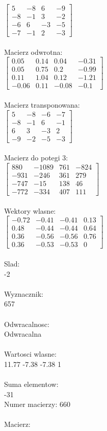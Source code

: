 \documentclass[a4paper,12pt]{article}
\begin{document}
$\begin{bmatrix} 5&-8&6&-9\\-8&-1&3&-2\\-6&6&-3&-5\\-7&-1&2&-3 \end{bmatrix}$
\\
\\
Macierz odwrotna:\\

$\begin{bmatrix} 0.05&0.14&0.04&-0.31\\0.05&0.75&0.2&-0.99\\0.11&1.04&0.12&-1.21\\-0.06&0.11&-0.08&-0.1 \end{bmatrix}$
\\
\\
Macierz transponowana:\\

$\begin{bmatrix} 5&-8&-6&-7\\-8&-1&6&-1\\6&3&-3&2\\-9&-2&-5&-3 \end{bmatrix}$
\\
\\
Macierz do potegi 3:\\

$\begin{bmatrix} 880&-1089&761&-824\\-931&-246&361&279\\-747&-15&138&46\\-772&-334&407&111 \end{bmatrix}$
\\
\\
Wektory wlasne:\\

$\begin{bmatrix} -0.72&-0.41&-0.41&0.13\\0.48&-0.44&-0.44&0.64\\0.36&-0.56&-0.56&0.76\\0.36&-0.53&-0.53&0 \end{bmatrix}$
\\
\\
Slad:\\
-2
\\
\\
Wyznacznik:\\
657
\\
\\
Odwracalnosc:\\
Odwracalna
\\
\\
Wartosci wlasne:\\
11.77 -7.38 -7.38 1
\\
\\
Suma elementow:\\
-31
\\
\newpage
Numer macierzy:
660
\\
\\
Macierz:\\
\end{document}
